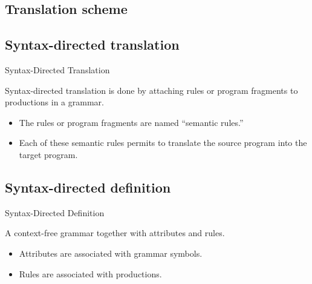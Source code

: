 \begin{bibunit}[apalike]
\section{Translation scheme}

\tableofcontentslide[sections={1-4},sectionstyle={show/shaded},subsectionstyle={show/show/hide},subsubsectionstyle={hide/hide/hide/hide}]

\subsection{Syntax-directed translation}

\begin{frame}{Syntax-Directed Translation}
	\begin{definition}
		Syntax-directed translation is done by attaching rules or program fragments to productions in a grammar.
	\end{definition}
	\begin{itemize}
	\item The rules or program fragments are named ``semantic rules.''
	\item Each of these semantic rules permits to translate the source program into the target program. \\
	\end{itemize}
	\vfill
\end{frame}

\subsection{Syntax-directed definition}

\tableofcontentslide[sections={1-4},sectionstyle={show/shaded},subsectionstyle={show/shaded/hide},subsubsectionstyle={show/show/hide/hide}]

\begin{frame}{Syntax-Directed Definition}
	\begin{definition}
		A context-free grammar together with attributes and rules.
	\end{definition}
	\begin{itemize}
	\item Attributes are associated with grammar symbols.
	\item Rules are associated with productions.
	\end{itemize}
	\vfill
	\begin{sdd}
	\pdots
	\end{sdd}
\end{frame}


\end{bibunit}

